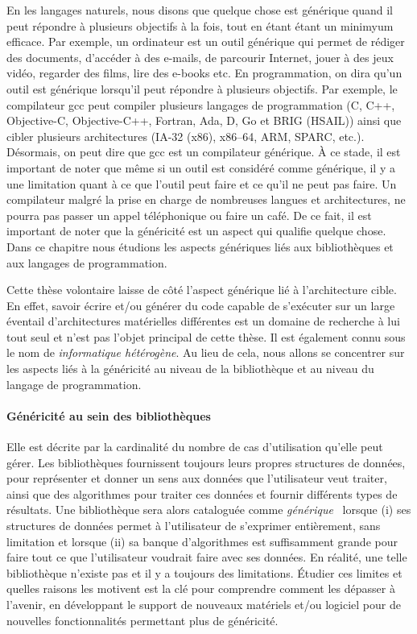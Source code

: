 En les langages naturels, nous disons que quelque chose est générique quand il peut répondre à plusieurs objectifs à la
fois, tout en étant étant un minimyum efficace. Par exemple, un ordinateur est un outil générique qui permet de rédiger
des documents, d'accéder à des e-mails, de parcourir Internet, jouer à des jeux vidéo, regarder des films, lire des
e-books etc. En programmation, on dira qu'un outil est générique lorsqu'il peut répondre à plusieurs objectifs. Par
exemple, le compilateur gcc peut compiler plusieurs langages de programmation (C, C++, Objective-C, Objective-C++,
Fortran, Ada, D, Go et BRIG (HSAIL)) ainsi que cibler plusieurs architectures (IA-32 (x86), x86--64, ARM, SPARC, etc.).
Désormais, on peut dire que gcc est un compilateur générique. À ce stade, il est important de noter que même si un outil
est considéré comme générique, il y a une limitation quant à ce que l'outil peut faire et ce qu'il ne peut pas faire. Un
compilateur malgré la prise en charge de nombreuses langues et architectures, ne pourra pas passer un appel téléphonique
ou faire un café. De ce fait, il est important de noter que la généricité est un aspect qui qualifie quelque chose. Dans
ce chapitre nous étudions les aspects génériques liés aux bibliothèques et aux langages de programmation.

Cette thèse volontaire laisse de côté l'aspect générique lié à l'architecture cible. En effet, savoir écrire et/ou
générer du code capable de s'exécuter sur un large éventail d'architectures matérielles différentes est un domaine de
recherche à lui tout seul et n'est pas l'objet principal de cette thèse. Il est également connu sous le nom de
\emph{informatique hétérogène}. Au lieu de cela, nous allons se concentrer sur les aspects liés à la généricité au
niveau de la bibliothèque et au niveau du langage de programmation.

\paragraph{Généricité au sein des bibliothèques} Elle est décrite par la cardinalité du nombre de cas d'utilisation
qu'elle peut gérer. Les bibliothèques fournissent toujours leurs propres structures de données, pour représenter et
donner un sens aux données que l'utilisateur veut traiter, ainsi que des algorithmes pour traiter ces données et fournir
différents types de résultats. Une bibliothèque sera alors cataloguée comme
\emph{générique}~\parencite{musser.1994.algorithm} lorsque (i) ses structures de données permet à l'utilisateur de
s'exprimer entièrement, sans limitation et lorsque (ii) sa banque d'algorithmes est suffisamment grande pour faire tout
ce que l'utilisateur voudrait faire avec ses données. En réalité, une telle bibliothèque n'existe pas et il y a toujours
des limitations. Étudier ces limites et quelles raisons les motivent est la clé pour comprendre comment les dépasser à
l'avenir, en développant le support de nouveaux matériels et/ou logiciel pour de nouvelles fonctionnalités permettant
plus de généricité.

